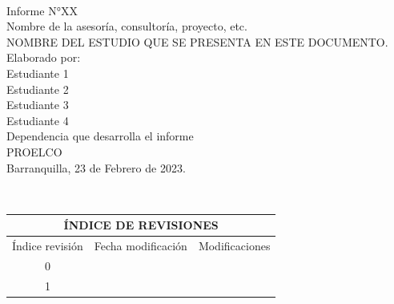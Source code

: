 \documentclass[12pt]{article}
\begin{document}
\begin{center}
\phantom{This text will be invisible} \\
\vspace{1.5cm}
Informe N°XX\\
Nombre de la asesoría, consultoría, proyecto, etc.\\
\vspace{4cm}
NOMBRE DEL ESTUDIO QUE SE PRESENTA EN ESTE DOCUMENTO.\\
\vspace{4cm}
Elaborado por:\\
Estudiante 1\\
Estudiante 2\\
Estudiante 3\\
Estudiante 4\\
\vspace{4cm}
Dependencia que desarrolla el informe\\
PROELCO\\
Barranquilla, 23 de Febrero de 2023.\\
\vspace{2cm}
\end{center}
\newpage
\phantom{This text will be invisible} \\

\begin{table}[h]
\centering
\begin{tabular}{|ccc|}
\hline
\multicolumn{3}{|c|}{ÍNDICE DE REVISIONES}                                                       \\ \hline
\multicolumn{1}{|c|}{Índice revisión} & \multicolumn{1}{c|}{Fecha modificación} & Modificaciones \\ \hline
\multicolumn{1}{|c|}{0}               & \multicolumn{1}{c|}{}                   &                \\ \hline
\multicolumn{1}{|c|}{1}               & \multicolumn{1}{c|}{}                   &                \\ \hline
\end{tabular}
\end{table}
\end{document}
